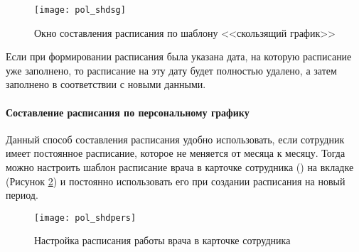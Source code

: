 \begin{figure}[ht]\centering
 \texttt{[image: pol\_shdsg]}
 \caption{Окно составления расписания по шаблону <<скользящий график>>}
 \label{img_pol_shdsg}
\end{figure} 

\begin{prim}
Если при формировании расписания была указана дата, на которую расписание уже заполнено, то расписание на эту дату будет полностью удалено, а затем заполнено в соответствии с новыми данными.
\end{prim}

\paragraph{Составление расписания по персональному графику} \label{pol_shdpers}

Данный способ составления расписания удобно использовать, если сотрудник имеет постоянное расписание, которое не меняется от месяца к месяцу. Тогда можно настроить шаблон расписание врача в карточке сотрудника () на вкладке  (Рисунок \ref{img_pol_shdpers}) и постоянно использовать его при создании расписания на новый период.

\begin{figure}[ht]\centering
 \texttt{[image: pol\_shdpers]}
 \caption{Настройка расписания работы врача в карточке сотрудника}
 \label{img_pol_shdpers}
\end{figure} 

